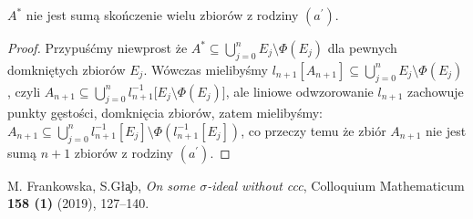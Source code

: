 \documentclass[12pt]{amsart}
\theoremstyle{plain}
\theoremstyle{definition}
\theoremstyle{remark}
\newcommand{\aidealprime}{\mathit{(a^\prime)}}
\begin{document}
 $A^*$ nie jest sumą skończenie
wielu zbiorów z rodziny $\aidealprime$.
\begin{proof}
Przypuśćmy niewprost że
$A^* \subseteq \bigcup_{j=0}^n E_j \setminus \Phi(E_j)$
dla pewnych domkniętych zbiorów $E_j$.
Wówczas mielibyśmy
$l_{n+1}[A_{n+1}] \subseteq \bigcup_{j=0}^n E_j \setminus \Phi(E_j)$,
czyli
$A_{n+1} \subseteq \bigcup_{j=0}^n l_{n+1}^{-1}\big[E_j \setminus \Phi(E_j)\big]$,
ale liniowe odwzorowanie $l_{n+1}$ zachowuje punkty gęstości,
domknięcia zbiorów, zatem mielibyśmy:
$A_{n+1} \subseteq \bigcup_{j=0}^n l_{n+1}^{-1}[E_j] \setminus
\Phi(l_{n+1}^{-1}[E_j])$, co przeczy temu że zbiór
$A_{n+1}$ nie jest sumą $n+1$ zbiorów z rodziny $\aidealprime$.
\end{proof}

\begin{thebibliography}{10}

M. Frankowska, S.G\l{}\c{a}b, 
\emph{On some $\sigma$-ideal without ccc}, Colloquium Mathematicum \textbf{158 (1)} (2019), 127--140.
\end{thebibliography}
\end{document}
